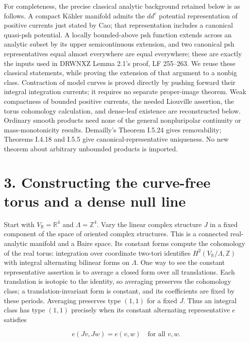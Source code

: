 \documentclass[11pt]{article}
\begin{document}
For completeness, the precise classical analytic background retained below is as follows. A compact Kähler manifold admits the $dd^c$ potential representation of positive currents just stated by Cao; that representation includes a canonical quasi-\allowbreak{}psh potential. A locally bounded-\allowbreak{}above psh function extends across an analytic subset by its upper semicontinuous extension, and two canonical psh representatives equal almost everywhere are equal everywhere; these are exactly the inputs used in DRWNXZ Lemma 2.1's proof, LF 255–263. We reuse these classical statements, while proving the extension of that argument to a nonbig class. Contraction of model curves is proved directly by pushing forward their integral integration currents; it requires no separate proper-\allowbreak{}image theorem. Weak compactness of bounded positive currents, the needed Liouville assertion, the torus cohomology calculation, and dense-\allowbreak{}leaf existence are reconstructed below. Ordinary smooth products need none of the general nonpluripolar continuity or mass-\allowbreak{}monotonicity results. Demailly's Theorem I.5.24 gives removability; Theorems I.4.18 and I.5.5 give canonical-\allowbreak{}representative uniqueness. No new theorem about arbitrary unbounded products is imported.

\section*{3. Constructing the curve-\allowbreak{}free torus and a dense null line}

Start with $V_{\mathbb R}=\mathbb R^4$ and $\Lambda=\mathbb Z^4$. Vary the linear complex structure $J$ in a fixed component of the space of oriented complex structures. This is a connected real-\allowbreak{}analytic manifold and a Baire space. Its constant forms compute the cohomology of the real torus: integration over coordinate two-\allowbreak{}tori identifies $H^2(V_{\mathbb R}/\Lambda,\mathbb Z)$ with integral alternating bilinear forms on $\Lambda$. One way to see the constant representative assertion is to average a closed form over all translations. Each translation is isotopic to the identity, so averaging preserves the cohomology class; a translation-\allowbreak{}invariant form is constant, and its coefficients are fixed by these periods. Averaging preserves type $(1,1)$ for a fixed $J$. Thus an integral class has type $(1,1)$ precisely when its constant alternating representative $e$ satisfies

\[e(Jv,Jw)=e(v,w)\quad\text{for all }v,w.\]
\end{document}
